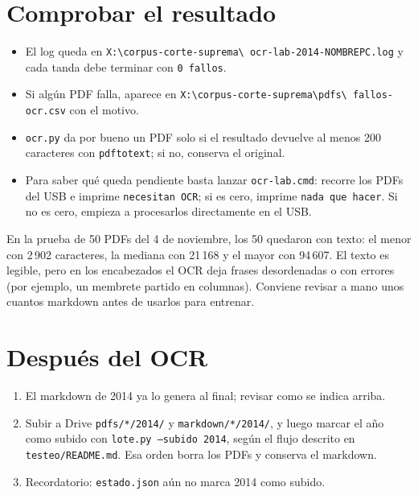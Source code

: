 ﻿\documentclass[11pt,a4paper]{article}
\begin{document}
\section{Comprobar el resultado}

\begin{itemize}
  \item El log queda en \texttt{X:\textbackslash corpus-corte-suprema\textbackslash
        ocr-lab-2014-NOMBREPC.log} y cada tanda debe terminar con \texttt{0 fallos}.
  \item Si algún PDF falla, aparece en
        \texttt{X:\textbackslash corpus-corte-suprema\textbackslash pdfs\textbackslash
        fallos-ocr.csv} con el motivo.
  \item \texttt{ocr.py} da por bueno un PDF solo si el resultado devuelve al menos 200
        caracteres con \texttt{pdftotext}; si no, conserva el original.
  \item Para saber qué queda pendiente basta lanzar \texttt{ocr-lab.cmd}: recorre los PDFs
        del USB e imprime \texttt{necesitan OCR}; si es cero, imprime \texttt{nada que
        hacer}. Si no es cero, empieza a procesarlos directamente en el USB.
\end{itemize}

En la prueba de 50 PDFs del 4 de noviembre, los 50 quedaron con texto: el menor con 2\,902
caracteres, la mediana con 21\,168 y el mayor con 94\,607. El texto es legible, pero en
los encabezados el OCR deja frases desordenadas o con errores (por ejemplo, un membrete
partido en columnas). Conviene revisar a mano unos cuantos markdown antes de usarlos para
entrenar.

\section{Después del OCR}

\begin{enumerate}
  \item El markdown de 2014 ya lo genera  al final; revisar
         como se indica arriba.
  \item Subir a Drive \texttt{pdfs/*/2014/} y \texttt{markdown/*/2014/}, y luego marcar el
        año como subido con \texttt{lote.py --subido 2014}, según el flujo descrito en
        \texttt{testeo/README.md}. Esa orden borra los PDFs y conserva el markdown.
  \item Recordatorio: \texttt{estado.json} aún no marca 2014 como subido.
\end{enumerate}
\end{document}
